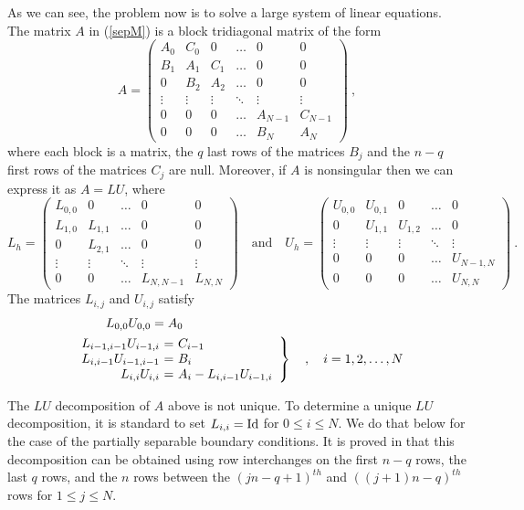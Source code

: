 As we can see, the problem now is to solve a large system of linear
equations.  The matrix $A$ in (\ref{sepM}) is a block tridiagonal matrix
of the form
\[
A = \begin{pmatrix}
A_0 & C_0 & 0 &  \ldots & 0 & 0 \\
B_1 & A_1 & C_1 & \ldots & 0 & 0 \\
0 & B_2 & A_2 & \ldots & 0 & 0 \\
\vdots & \vdots & \vdots & \ddots & \vdots & \vdots \\
0 & 0 & 0 & \ldots & A_{N-1} & C_{N-1} \\
0 & 0 & 0 & \ldots & B_N & A_N
\end{pmatrix} \ ,
\]
where each block is a \nn matrix, the $q$ last rows of the \nn
matrices $B_j$ and the $n-q$ first rows of the \nn matrices
$C_j$ are null.  Moreover, if $A$ is nonsingular then we can express
it as $A = L U$, where
\[
L_h = \begin{pmatrix}
L_{0,0} & 0 & \ldots & 0 & 0 \\
L_{1,0} & L_{1,1} & \ldots & 0 & 0 \\
0 & L_{2,1} &  \ldots & 0 & 0 \\
\vdots & \vdots & \ddots & \vdots & \vdots \\
0 & 0 & \ldots & L_{N,N-1} & L_{N,N}
\end{pmatrix}
\quad \text{and} \quad
U_h = \begin{pmatrix}
U_{0,0} & U_{0,1} & 0 & \ldots & 0 \\
0 & U_{1,1} & U_{1,2} & \ldots & 0 \\
\vdots & \vdots & \vdots & \ddots & \vdots \\
0 & 0 & 0 & \ldots & U_{N-1,N} \\
0 & 0 & 0 & \ldots &  U_{N,N}
\end{pmatrix} \ .
\]
The \nn matrices $L_{i,j}$ and $U_{i,j}$ satisfy
\begin{align*}
&\hspace{2.7em}  L_{0,0} U_{0,0} = A_0 \\
& \left.
\begin{array}{r@{\ =\ }l}
L_{i-1,i-1} U_{i-1,i} & C_{i-1} \\
L_{i,i-1} U_{i-1,i-1} & B_i \\
L_{i,i} U_{i,i} & A_i - L_{i,i-1} U_{i-1,i} 
\end{array} 
\right\} \quad , \quad i=1, 2, \ldots, N
\end{align*}

The $LU$ decomposition of $A$ above is not unique.  To determine a
unique $LU$ decomposition, it is standard to set $L_{i,i} = \operatorname{Id}$ for
$0\leq i \leq N$.  We do that below for the case of the partially
separable boundary conditions.  It is proved in \cite{K} that
this decomposition can be obtained using row interchanges on the first
$n-q$ rows, the last $q$ rows, and the $n$ rows between the
$(jn-q+1)^{th}$ and $((j+1)n-q)^{th}$ rows for $1\leq j\leq N$.

